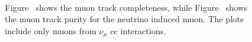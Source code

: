 \begin{figure}[]
\centering
{} 
 \\ 
\caption[Muon Completeness and Purity]{Figure~ shows the muon track completeness, while Figure~ shows the muon track purity for the neutrino induced muon. The plots include only muons from $\nu_\mu$ \acrshort{cc} interactions.
}
\label{fig:muon_reco_completenesspurity}
\end{figure}



